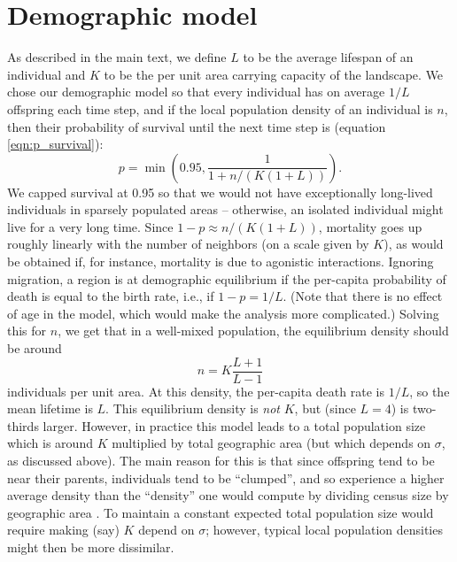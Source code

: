 \documentclass[10pt,twoside,lineno,hidelinks]{preprint}
\begin{document}
\section{Demographic model}
As described in the main text, we define $L$ to be the average lifespan of
an individual and $K$ to be the per unit area carrying capacity of the landscape.
We chose our demographic model so that every individual has on average $1/L$ offspring
each time step,
and if the local population density of an individual is $n$,
then their probability of survival until the next time step is
(equation \eqref{eqn:p_survival}):
\begin{equation}
    p = \min\left( 0.95, \frac{1}{1 + n / (K (1+L))} \right) .
\end{equation}
We capped survival at 0.95 so that we would not have exceptionally long-lived individuals
in sparsely populated areas --
otherwise, an isolated individual might live for a very long time.
Since $1 - p \approx n / (K (1 + L))$,
mortality goes up roughly linearly with the number of neighbors (on a scale given by $K$),
as would be obtained if, for instance, mortality is due to agonistic interactions.
Ignoring migration,
a region is at demographic equilibrium if the per-capita probability of death
is equal to the birth rate,
i.e., if $1 - p = 1/L$.
(Note that there is no effect of age in the model,
which would make the analysis more complicated.)
Solving this for $n$,
we get that in a well-mixed population, the equilibrium density should be around
\begin{equation}
    n = K \frac{L+1}{L-1}
\end{equation}
individuals per unit area.
At this density, the per-capita death rate is $1/L$, so the mean lifetime is $L$.
This equilibrium density is \emph{not} $K$, but (since $L=4$) is two-thirds larger.
However, in practice this model leads to a total population size which is around $K$
multiplied by total geographic area
(but which depends on $\sigma$, as discussed above).
The main reason for this is that
since offspring tend to be near their parents, individuals tend to be ``clumped'',
and so experience a higher average density than the ``density'' one would compute
by dividing census size by geographic area \citep{lloyd1967crowding}.
To maintain a constant expected total population size
would require making (say) $K$ depend on $\sigma$;
however, typical local population densities might then be more dissimilar.


\clearpage 
\end{document}
